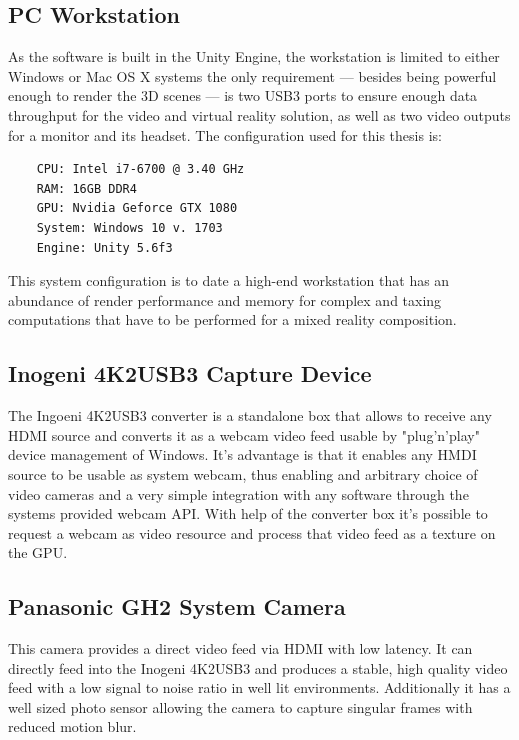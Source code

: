 \subsection{PC Workstation}

As the software is built in the Unity Engine, the workstation is limited to 
either Windows or Mac OS X systems the only requirement --- besides being 
powerful enough to render the 3D scenes --- is two USB3 ports to ensure enough 
data throughput for the video and virtual reality solution, as well as two 
video outputs for a monitor and its headset.
\newline
The configuration used for this thesis is:
\begin{lstlisting}
	CPU: Intel i7-6700 @ 3.40 GHz
	RAM: 16GB DDR4
	GPU: Nvidia Geforce GTX 1080
	System: Windows 10 v. 1703
	Engine: Unity 5.6f3
\end{lstlisting}

This system configuration is to date a high-end workstation that has an 
abundance of render performance and memory for complex and taxing computations 
that have to be performed for a mixed reality composition.

\subsection{Inogeni 4K2USB3 Capture Device}
The Ingoeni 4K2USB3 converter is a standalone box that allows to receive any 
HDMI source and converts it as a webcam video feed usable by "plug'n'play" 
device management of Windows. It's advantage is that it enables any HMDI source 
to be usable as system webcam, thus enabling and arbitrary choice of video 
cameras and a very simple integration with any software through the systems 
provided webcam API. With help of the converter box it's possible to request a 
webcam as video resource and process that video feed as a texture on the GPU.

\subsection{Panasonic GH2 System Camera}
This camera provides a direct video feed via HDMI with low latency. It can 
directly feed into the Inogeni 4K2USB3 and produces a stable, high quality 
video feed with a low signal to noise ratio in well lit environments. 
Additionally it has a well sized photo sensor allowing the camera to capture 
singular frames with reduced motion blur.

